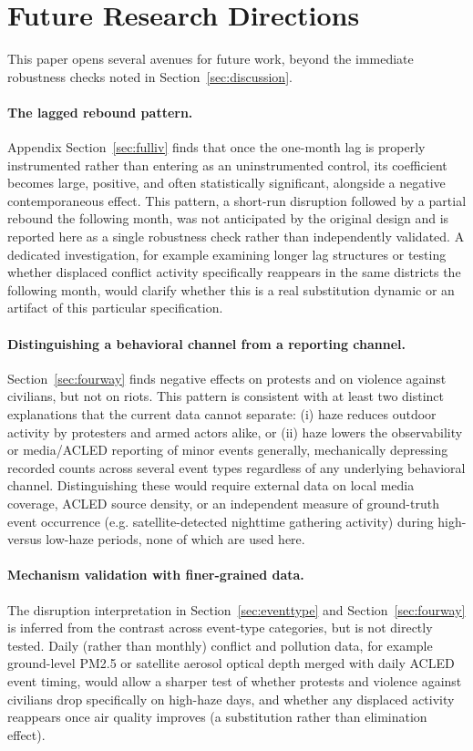 \documentclass[12pt]{article}
\begin{document}
\section{Future Research Directions}
\label{sec:future}

This paper opens several avenues for future work, beyond the immediate robustness checks noted in Section~\ref{sec:discussion}.

\paragraph{The lagged rebound pattern.} Appendix Section~\ref{sec:fulliv} finds that once the one-month lag is properly instrumented rather than entering as an uninstrumented control, its coefficient becomes large, positive, and often statistically significant, alongside a negative contemporaneous effect. This pattern, a short-run disruption followed by a partial rebound the following month, was not anticipated by the original design and is reported here as a single robustness check rather than independently validated. A dedicated investigation, for example examining longer lag structures or testing whether displaced conflict activity specifically reappears in the same districts the following month, would clarify whether this is a real substitution dynamic or an artifact of this particular specification.

\paragraph{Distinguishing a behavioral channel from a reporting channel.} Section~\ref{sec:fourway} finds negative effects on protests and on violence against civilians, but not on riots. This pattern is consistent with at least two distinct explanations that the current data cannot separate: (i) haze reduces outdoor activity by protesters and armed actors alike, or (ii) haze lowers the observability or media/ACLED reporting of minor events generally, mechanically depressing recorded counts across several event types regardless of any underlying behavioral channel. Distinguishing these would require external data on local media coverage, ACLED source density, or an independent measure of ground-truth event occurrence (e.g. satellite-detected nighttime gathering activity) during high- versus low-haze periods, none of which are used here.

\paragraph{Mechanism validation with finer-grained data.} The disruption interpretation in Section~\ref{sec:eventtype} and Section~\ref{sec:fourway} is inferred from the contrast across event-type categories, but is not directly tested. Daily (rather than monthly) conflict and pollution data, for example ground-level PM2.5 or satellite aerosol optical depth merged with daily ACLED event timing, would allow a sharper test of whether protests and violence against civilians drop specifically on high-haze days, and whether any displaced activity reappears once air quality improves (a substitution rather than elimination effect).
\end{document}
